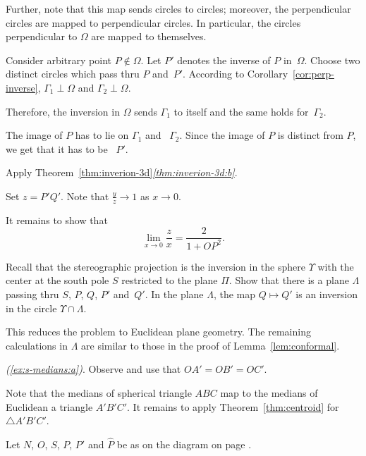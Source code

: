 Further, note that this map sends circles to circles;
moreover, the perpendicular circles are mapped to perpendicular circles.
In particular, the circles perpendicular to $\Omega$ are mapped to themselves.

Consider arbitrary point $P\notin\Omega$.
Let $P'$ denotes the inverse of $P$ in~$\Omega$.
Choose two distinct circles which pass thru $P$ and~$P'$.
According to Corollary~\ref{cor:perp-inverse}, 
$\Gamma_1\perp \Omega$ and $\Gamma_2\perp \Omega$.

Therefore, the inversion in $\Omega$ sends $\Gamma_1$ to itself and the same holds for~$\Gamma_2$. 

The image of $P$ has to lie on $\Gamma_1$ and ~$\Gamma_2$.
Since the image of $P$ is distinct from $P$, we get that it has to be ~$P'$.

Apply Theorem~\ref{thm:inverion-3d}\textit{\ref{thm:inverion-3d:b}}.

Set $z=P'Q'$.
Note that $\tfrac yz\to 1$ as $x\to 0$.

It remains to show that 
$$\lim_{x\to 0} \frac{z}{x}=\frac{2}{1+OP^2}.$$

Recall that the stereographic projection is the inversion in the sphere $\Upsilon$ with the center at the south pole $S$ restricted to the plane $\Pi$.
Show that there is a plane $\Lambda$ passing thru $S$, $P$, $Q$, $P'$ and~$Q'$.
In the plane $\Lambda$, the map $Q\mapsto Q'$ is an inversion in the circle $\Upsilon\cap \Lambda$.

This reduces the problem to Euclidean plane geometry.
The remaining calculations in $\Lambda$ are similar to those in the proof of Lemma~\ref{lem:conformal}.

\textit{(\ref{ex:s-medians:a})}.
Observe and use that 
$OA'=OB'=OC'$.

 Note that the medians of spherical triangle $ABC$ 
map to the medians of Euclidean a triangle $A'B'C'$.
It remains to apply Theorem~\ref{thm:centroid} for $\triangle A'B'C'$.

\setcounter{eqtn}{0}

Let $N$, $O$, $S$, $P$, $P'$ and $\hat P$ 
be as on the diagram on page 
\pageref{pic:stereographic_projection-klein}.


